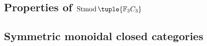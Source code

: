 \subsection{Properties of \texorpdfstring{\( \Stmod\tuple{ \Fb_3 C_3 } \)}{Stmod(F\_3C\_3)}}


\subsection{Symmetric monoidal closed categories}
